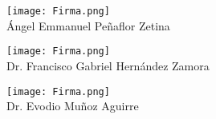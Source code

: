 \documentclass[
  12pt,
  letterpaper,
  spanish
]{letter}
\newcommand{\alumno}{Ángel Emmanuel Peñaflor Zetina}
\newcommand{\directorUno}{Francisco Gabriel Hernández Zamora}
\newcommand{\directorDos}{Evodio Muñoz Aguirre}
\begin{document}
\begin{letter}
\begin{multicols}{3}
\begin{center}
  \texttt{[image: Firma.png]}\\
  \alumno
\end{center}

  \columnbreak 

\begin{center}
  \texttt{[image: Firma.png]}\\
  Dr. \directorUno
\end{center}
  
  \columnbreak 
  
\begin{center}
  \texttt{[image: Firma.png]}\\
  Dr. \directorDos
\end{center}
\end{multicols}

\end{letter}
\end{document}
